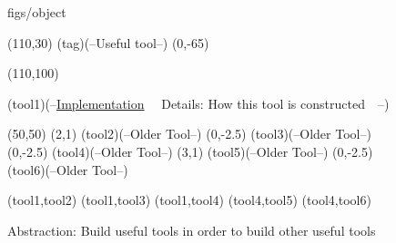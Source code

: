 






\begin {figure}


\Draw

 {figs/object}

\MinNodeSize(110,30)
\RectNode(tag)(--Useful tool--)
\Move(0,-65)

\MinNodeSize(110,100)

\RectNode(tool1)(--\underline{Implementation}~~
		Details:
		How this tool is
		constructed~~--)


\MinNodeSize(50,50)   
\MoveToExit(2,1)
\RectNode(tool2)(--Older
			Tool--)
\MoveToExit (0,-2.5)
\RectNode(tool3)(--Older
			Tool--)
\MoveToExit (0,-2.5)
\RectNode(tool4)(--Older
			Tool--)
\MoveToExit (3,1)
\RectNode(tool5)(--Older
			Tool--)
\MoveToExit (0,-2.5)
\RectNode(tool6)(--Older
			Tool--)

\Edge(tool1,tool2)
\Edge(tool1,tool3)
\Edge(tool1,tool4)
\Edge(tool4,tool5)
\Edge(tool4,tool6)

\EndDraw

\caption {Abstraction: 
Build useful tools in order to build other useful tools}

\label {fig:methAbstr2}

\end {figure}


